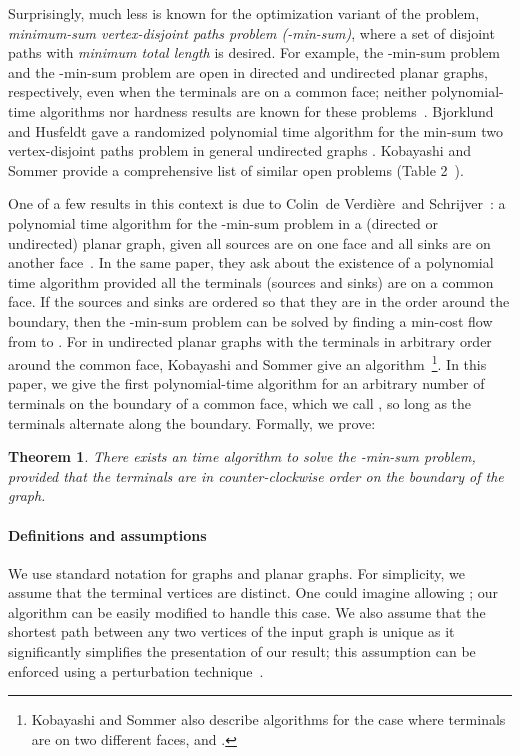 \documentclass[11pt,twoside]{article}
\newcommand{\EMPH}[1]{\emph{#1}}
\newtheorem{theorem}{Theorem}[section]
\newcommand{\eric}{Colin~de Verdi{\`e}re}
\begin{document}
Surprisingly, much less is known for the optimization variant of the problem, \EMPH{minimum-sum  vertex-disjoint paths problem (-min-sum)}, where a set of disjoint paths with \emph{minimum total length} is desired. 
For example, the -min-sum problem and the -min-sum problem are open in directed and undirected planar graphs, respectively, even when the terminals are on a common face; neither polynomial-time algorithms nor hardness results are known for these problems~\cite{kobayashi2010shortest}. Bjorklund and Husfeldt gave a randomized polynomial time algorithm for the min-sum two vertex-disjoint paths problem in general undirected graphs \cite{bjorklund2014shortest}. Kobayashi and Sommer provide a comprehensive list of similar open problems (Table 2~\cite{kobayashi2010shortest}).



One of a few results in this context is due to \eric~and Schrijver~\cite{verdiere2011shortest}: a polynomial time algorithm for the -min-sum problem in a (directed or undirected) planar graph, given all sources are on one face and all sinks are on another face~\cite{verdiere2011shortest}.  In the same paper, they ask about the existence of a polynomial time algorithm provided all the terminals (sources and sinks) are on a common face. If the sources and sinks are ordered so that they are in the order  around the boundary, then the -min-sum problem can be solved by finding a min-cost flow from  to .  For  in undirected planar graphs with the terminals in arbitrary order around the common face, Kobayashi and Sommer give an  algorithm~\cite{kobayashi2010shortest}\footnote{Kobayashi and Sommer also describe algorithms for the case where terminals are on two different faces, and .}.
In this paper, we give the first polynomial-time algorithm for an arbitrary number of terminals on the boundary of a common face, which we call , so long as the terminals alternate along the boundary.  Formally, we prove:
\begin{theorem}
There exists an  time algorithm to solve the -min-sum problem, provided that the terminals  are in counter-clockwise order on the boundary of the graph.
\end{theorem}

\paragraph{Definitions and assumptions} We use standard notation for graphs and planar graphs.  For simplicity, we assume that the terminal vertices are distinct.  One could imagine allowing ; our algorithm can be easily modified to handle this case.  We also assume that the shortest path between any two vertices of the input graph is unique as it significantly simplifies the presentation of our result; this assumption can be enforced using a perturbation technique~\cite{MVV87}.
\end{document}
